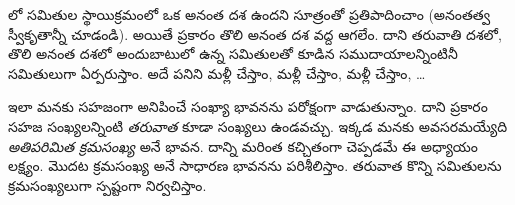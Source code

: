 \documentclass[../../../include/open-logic-section]{subfiles}
\begin{document}


లో సమితుల స్థాయిక్రమంలో ఒక అనంత దశ ఉందని
\stagesinf{} సూత్రంతో ప్రతిపాదించాం (అనంతత్వ స్వీకృతాన్నీ చూడండి).
అయితే \stagessucc{} ప్రకారం తొలి అనంత దశ వద్ద ఆగలేం.
దాని తరువాతి దశలో, తొలి అనంత దశలో అందుబాటులో ఉన్న సమితులతో
కూడిన సముదాయాలన్నింటినీ సమితులుగా ఏర్పరుస్తాం. అదే పనిని
మళ్లీ చేస్తాం, మళ్లీ చేస్తాం, మళ్లీ చేస్తాం, \dots

ఇలా మనకు సహజంగా అనిపించే సంఖ్యా భావనను
పరోక్షంగా వాడుతున్నాం. దాని ప్రకారం సహజ సంఖ్యలన్నింటి
\emph{తరువాత} కూడా సంఖ్యలు ఉండవచ్చు. ఇక్కడ మనకు అవసరమయ్యేది
\emph{అతిపరిమిత క్రమసంఖ్య} అనే భావన. దాన్ని మరింత కచ్చితంగా
చెప్పడమే ఈ అధ్యాయం లక్ష్యం. మొదట క్రమసంఖ్య అనే సాధారణ
భావనను పరిశీలిస్తాం. తరువాత కొన్ని సమితులను క్రమసంఖ్యలుగా
స్పష్టంగా నిర్వచిస్తాం.
\end{document}

